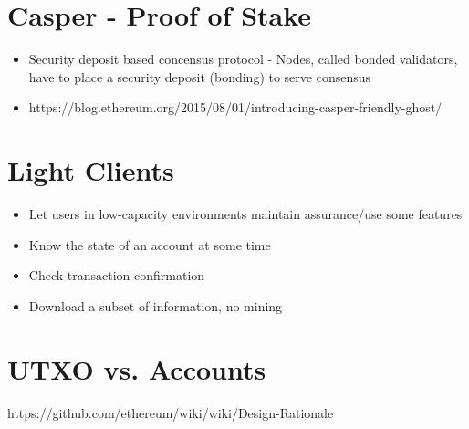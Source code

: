\documentclass{article}
\begin{document}
\section*{Casper - Proof of Stake}
\begin{itemize}
  \item Security deposit based concensus protocol - Nodes, called bonded validators, have to place a security deposit (bonding) to serve consensus
  \item https://blog.ethereum.org/2015/08/01/introducing-casper-friendly-ghost/
\end{itemize}

\section*{Light Clients}
\begin{itemize}
  \item Let users in low-capacity environments maintain assurance/use some features
  \item Know the state of an account at some time
  \item Check transaction confirmation
  \item Download a subset of information, no mining
\end{itemize}


\section*{UTXO vs. Accounts}
https://github.com/ethereum/wiki/wiki/Design-Rationale
\end{document}
